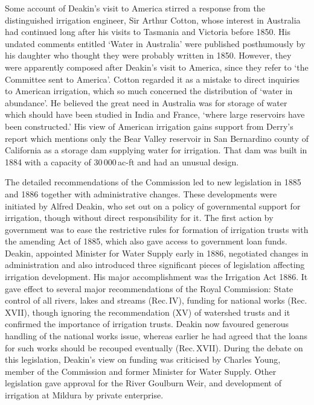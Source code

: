 Some account of Deakin's visit to America stirred a response from the
distinguished irrigation engineer, Sir Arthur Cotton,   whose interest in Australia had continued long after his visits
to Tasmania and Victoria before 1850.  His undated comments entitled
`Water in Australia' were published posthumously by his daughter who
thought they were probably written in 1850.  However, they were
apparently composed after Deakin's visit to America, since they refer
to `the Committee sent to America'.  Cotton regarded it as a mistake
to direct inquiries to American irrigation, which so much concerned
the distribution of `water in abundance'.  He believed the great need
in Australia was for storage of water which should have been studied
in India and France, `where large reservoirs have been constructed.'
His view of American irrigation gains support from Derry's report
which mentions only the Bear Valley reservoir in San Bernardino county
of California as a storage dam supplying water for irrigation.  That
dam was built in 1884 with a capacity of 30\,000\,ac-ft and had an
unusual design.

The detailed recommendations of the Commission led to new legislation
in 1885 and 1886 together with administrative changes.  These
developments were initiated by Alfred Deakin, who set out on a policy
of governmental support for irrigation, though without direct
responsibility for it.  The first action by government was to ease the
restrictive rules for formation of irrigation trusts with the amending
Act of 1885, which also gave access to government loan funds.  Deakin,
appointed Minister for Water Supply early in 1886, negotiated changes
in administration and also introduced three significant pieces of
legislation affecting irrigation development.  His major
accomplishment was the Irrigation Act 
1886. It gave effect to several major recommendations of the Royal
Commission: State control of all rivers, lakes and streams (Rec.\,IV),
funding for national works (Rec.\,XVII), though ignoring the
recommendation (XV) of watershed trusts and it confirmed the
importance of irrigation trusts.  Deakin now favoured generous
handling of the national works issue, whereas earlier he had agreed
that the loans for such works should be recouped eventually
(Rec.\,XVII).  During the debate on this legislation, Deakin's view on
funding was criticised by Charles Young,  member of
the Commission and former Minister for Water Supply.  Other
legislation gave approval for the River Goulburn Weir, and development
of irrigation at Mildura  by private enterprise.


